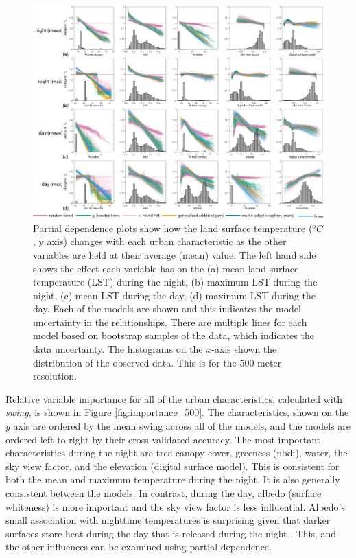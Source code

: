 \documentclass[final,3p,times,twocolumn,sort&compress]{elsarticle}
\begin{document}
\begin{figure}
    \centering
    \includegraphics[width=\linewidth]{fig/report/pdp_500.png}
    \caption[Partial dependence plots for LST at 500 meter resolution]{
    Partial dependence plots show how the land surface temperature ($^oC$, y axis) changes with each urban characteristic as the other variables are held at their average (mean) value. 
    The left hand side shows the effect each variable has on the (a) mean land surface temperature (LST) during the night, (b) maximum LST during the night, (c) mean LST during the day, (d) maximum LST during the day. 
    Each of the models are shown and this indicates the model uncertainty in the relationships.
    There are multiple lines for each model based on bootstrap samples of the data, which indicates the data uncertainty.
    The histograms on the $x$-axis shown the distribution of the observed data.
    This is for the 500 meter resolution.
    }
    \label{fig:pdp_500}
\end{figure}


Relative variable importance for all of the urban characteristics, calculated with \textit{swing}, is shown in Figure \ref{fig:importance_500}. 
The characteristics, shown on the $y$ axis are ordered by the mean swing across all of the models, and the models are ordered left-to-right by their cross-validated accuracy.
The most important characteristics during the night are tree canopy cover, greeness (nbdi), water, the sky view factor, and the elevation (digital surface model).
This is consistent for both the mean and maximum temperature during the night.
It is also generally consistent between the models. 
In contrast, during the day, albedo (surface whiteness) is more important and the sky view factor is less influential.
Albedo's small association with nighttime temperatures is surprising given that darker surfaces store heat during the day that is released during the night \cite{Voogt2003-mm, Zhou2014-wc}.
This, and the other influences can be examined using partial dependence.
\end{document}
